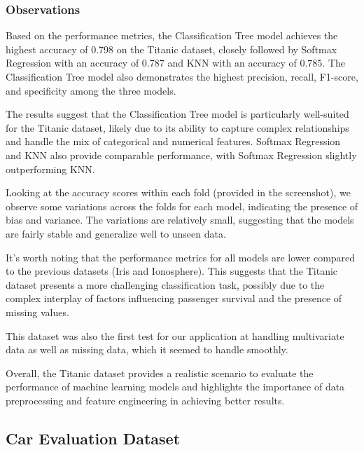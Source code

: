 \documentclass[letterpaper,10pt]{article}
\begin{document}
\subsubsection{Observations}

Based on the performance metrics, the Classification Tree model achieves the highest accuracy of 0.798 on the Titanic dataset, closely followed by Softmax Regression with an accuracy of 0.787 and KNN with an accuracy of 0.785. The Classification Tree model also demonstrates the highest precision, recall, F1-score, and specificity among the three models.\par

The results suggest that the Classification Tree model is particularly well-suited for the Titanic dataset, likely due to its ability to capture complex relationships and handle the mix of categorical and numerical features. Softmax Regression and KNN also provide comparable performance, with Softmax Regression slightly outperforming KNN. \par

Looking at the accuracy scores within each fold (provided in the screenshot), we observe some variations across the folds for each model, indicating the presence of bias and variance. The variations are relatively small, suggesting that the models are fairly stable and generalize well to unseen data. \par

It's worth noting that the performance metrics for all models are lower compared to the previous datasets (Iris and Ionosphere). This suggests that the Titanic dataset presents a more challenging classification task, possibly due to the complex interplay of factors influencing passenger survival and the presence of missing values. \par

This dataset was also the first test for our application at handling multivariate data as well as missing data, which it seemed to handle smoothly. \par

Overall, the Titanic dataset provides a realistic scenario to evaluate the performance of machine learning models and highlights the importance of data preprocessing and feature engineering in achieving better results.

\subsection{Car Evaluation Dataset}
\end{document}

